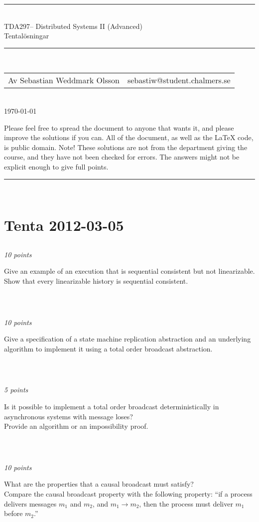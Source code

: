 \documentclass[a4paper]{article}
\makeatletter
\newcommand{\coursecode}{TDA297}
\newcommand{\coursename}{Distributed Systems II (Advanced)}
\newcommand{\authorname}{Sebastian Weddmark Olsson}
\newcommand{\authormail}{sebastiw@student.chalmers.se}
\newcommand{\doctitle}{Tentalösningar}
\newcommand{\horrule}[1]{\rule{\linewidth}{#1}} %
\newcommand{\points}[1]{\subsection{} \textit{#1 points}\\}
\newcommand{\question}[2][]{
  \noindent
  \parbox[t]{\textwidth}{#1 \parbox[t]{0.95\textwidth}{#2}}\\
}
\makeatother
\begin{document}
\thispagestyle{plain} %
\begin{center}
\horrule{0.5pt} \\[0.3cm] %
%
\huge \coursecode -- \coursename \\[1mm]
\Large \doctitle \\
\normalsize %
\horrule{2pt} \\[0.1cm] %
\begin{tabular}{ l r }
Av \authorname & \authormail
\end{tabular}\\[0.1cm]
\footnotesize \today\\[0.4cm]
\end{center}
{\footnotesize
Please feel free to spread the document to anyone that wants it, and please improve the solutions if you can. All of the document, as well as the \LaTeX{} code, is public domain.
Note! These solutions are not from the department giving the course, and they have not been checked for errors. The answers might not be explicit enough to give full points.\\
}
\horrule{0.5pt} %
\normalsize %
\\[2.5cm]

\section{Tenta 2012-03-05}

\points{10}
\question{Give an example of an execution that is sequential
  consistent but not linearizable. \\ Show that every linearizable
  history is sequential consistent.}

\points{10}
\question{Give a specification of a state machine replication
  abstraction and an underlying algorithm to implement it using a
  total order broadcast abstraction.}

\points{5}
\question{Is it possible to implement a total order broadcast
  deterministically in asynchronous systems with message loses? \\
  Provide an algorithm or an impossibility proof.}

\points{10}
\question{What are the properties that a causal broadcast must
  satisfy? \\ Compare the causal broadcast property with the following
property: ``if a process delivers messages $m_1$ and $m_2$, and $m_1
\rightarrow m_2$, then the process must deliver $m_1$ before $m_2$.''}
\end{document}
